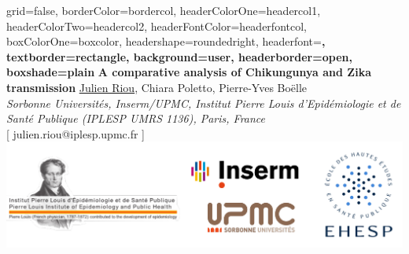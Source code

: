 \documentclass[a0paper,portrait]{baposter}
\begin{document}
\begin{poster}{
grid=false,
borderColor=bordercol, %
headerColorOne=headercol1, %
headerColorTwo=headercol2, %
headerFontColor=headerfontcol, %
boxColorOne=boxcolor, %
headershape=roundedright, %
headerfont=\Large\sf\bf, %
textborder=rectangle,
background=user,
headerborder=open, %
boxshade=plain
}
{}
%
%
{\sf\bf \huge{A comparative analysis of Chikungunya and Zika transmission}} %
{ \underline{Julien Riou}, Chiara Poletto, Pierre-Yves Boëlle\\ %
{\smaller \textit{ Sorbonne Universités, Inserm/UPMC, Institut Pierre Louis d’Epidémiologie et de Santé Publique (IPLESP UMRS 1136), Paris, France} \\ 
 \small{[ julien.riou@iplesp.upmc.fr ]}}} %
{\includegraphics[scale=.25]{logos2.pdf}} %


\end{poster}
\end{document}
